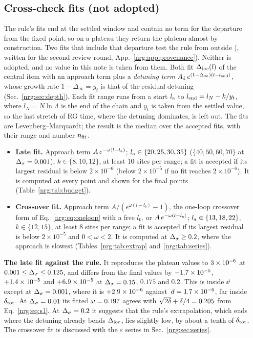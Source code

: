 \subsection{Cross-check fits (not adopted)}\label{nrg:sec:crosscheck}
The rule's fits end at the settled window and contain no term for the departure from the fixed point, so on a plateau they return the
plateau almost by construction. Two fits that include that departure test the rule from outside (,
written for the second review round, App.~\ref{nrg:app:provenance}). Neither is adopted, and no value in this note is taken from them. Both
fit $\Delta_{\rm loc}(l)$ of the central item with an approach term plus a \emph{detuning term} $A_{\rm d}\,e^{(1-\Delta_\infty)(l-l_{\rm end})}$,
whose growth rate $1-\Delta_\infty=y_t$ is that of the residual detuning (Sec.~\ref{nrg:sec:depth}). Each fit range runs from a start
$l_{\rm a}$ to $l_{\rm end}=l_N-k/y_t$, where $l_N=N\ln\Lambda$ is the end of the chain and $y_t$ is taken from the settled value, so the
last stretch of RG time, where the detuning dominates, is left out. The fits are Levenberg--Marquardt; the result is the median over the
accepted fits, with their range and number $n_{\rm fit}$.
\begin{itemize}
\item \textbf{Late fit.} Approach term $A\,e^{-\omega(l-l_{\rm a})}$; $l_{\rm a}\in\{20,25,30,35\}$ ($\{40,50,60,70\}$ at
  $\Delta_\sigma=0.001$), $k\in\{8,10,12\}$, at least 10 sites per range; a fit is accepted if its largest residual is below $2\times10^{-6}$
  (below $2\times10^{-5}$ if no fit reaches $2\times10^{-6}$). It is computed at every point and shown for the final points
  (Table~\ref{nrg:tab:budget}).
\item \textbf{Crossover fit.} Approach term $A/(e^{\omega(l-l_0)}-1)$, the one-loop crossover form of Eq.~\eqref{nrg:eq:oneloop} with a
  free $l_0$, or $A\,e^{-\omega(l-l_{\rm a})}$; $l_{\rm a}\in\{13,18,22\}$, $k\in\{12,15\}$, at least 8 sites per range; a fit is
  accepted if its largest residual is below $2\times10^{-5}$ and $0<\omega<2$. It is computed at $\Delta_\sigma\ge0.2$, where the approach is
  slowest (Tables~\ref{nrg:tab:extrap} and~\ref{nrg:tab:series}).
\end{itemize}
\textbf{The late fit against the rule.} It reproduces the plateau values to $3\times10^{-6}$ at $0.001\le\Delta_\sigma\le0.125$, and differs from
the final values by $-1.7\times10^{-5}$, $+1.4\times10^{-5}$ and $+6.9\times10^{-5}$ at $\Delta_\sigma=0.15$, $0.175$ and $0.2$. This is
inside $\dd$ except at $\Delta_\sigma=0.001$, where it is $+2.9\times10^{-6}$ against $\,d=1.7\times10^{-6}$, far inside $\delta_{\rm tot}$. At $\Delta_\sigma=0.01$
its fitted $\omega=0.197$ agrees with $\sqrt{2\delta}+\delta/4=0.205$ from Eq.~\eqref{nrg:eq:s1}. At $\Delta_\sigma=0.2$ it suggests
that the rule's extrapolation, which ends where the detuning already bends $\Delta_{\rm loc}$, lies slightly low, by about a tenth of $\delta_{\rm tot}$.
The crossover fit is discussed with the $\varepsilon$ series in Sec.~\ref{nrg:sec:series}.

